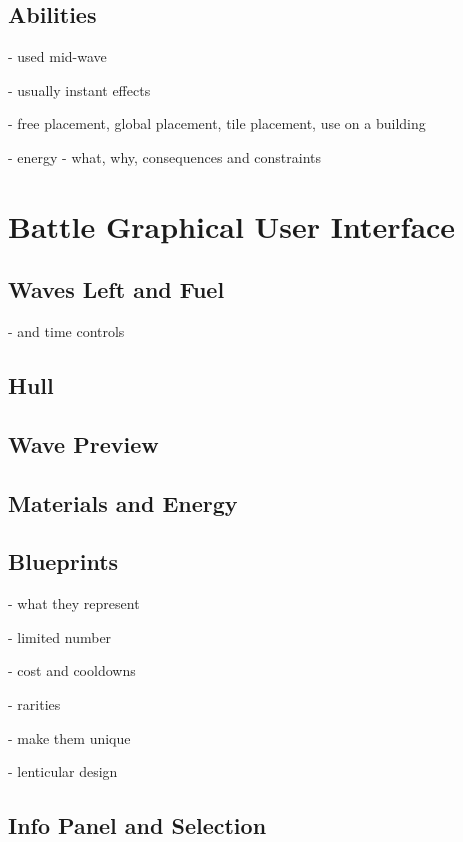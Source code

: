 \subsection{Abilities}

- used mid-wave

- usually instant effects

- free placement, global placement, tile placement, use on a building

- energy - what, why, consequences and constraints


\section{Battle Graphical User Interface}


\subsection{Waves Left and Fuel}

- and time controls

\subsection{Hull}

\subsection{Wave Preview}

\subsection{Materials and Energy}

\subsection{Blueprints}

- what they represent

- limited number

- cost and cooldowns

- rarities

- make them unique

- lenticular design

\subsection{Info Panel and Selection}


